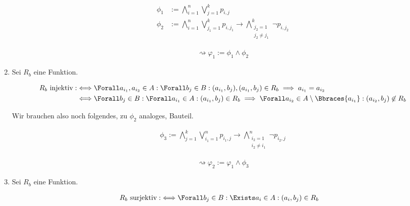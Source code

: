 \begin{solution}
\begin{enumerate}[label = \arabic*.]
  \begin{align*}
    \phi_1
    & :=
    \bigwedge_{i=1}^n \bigvee_{j=1}^kp_{i,j} \\
    \phi_2
    & :=
    \bigwedge_{i=1}^n \bigvee_{j_1=1}^kp_{i,j_1}
    \to
    \bigwedge_{\substack{j_2=1 \\ j_2\neq j_1}}^{k}\neg p_{i,j_2}
  \end{align*}

  \begin{align*}
    \rightsquigarrow
    \varphi_1 := \phi_1 \land \phi_2
  \end{align*}

  \item Sei $R_b$ eine Funktion.
  
  \begin{align*}
    R_b ~\text{injektiv}
    :\iff
    & \Forall a_{i_1}, a_{i_2} \in A:
    \Forall b_j \in B:
    (a_{i_1}, b_j), (a_{i_1}, b_j) \in R_b
    \implies
    a_{i_1} = a_{i_2} \\
    \iff
    & \Forall b_j \in B:
    \Forall a_{i_1} \in A:
    (a_{i_1}, b_j) \in R_b
    \implies
    \Forall a_{i_2} \in A \setminus \Bbraces{a_{i_1}}:
    (a_{i_2}, b_j) \not \in R_b
  \end{align*}

  Wir brauchen also noch folgendes, zu $\phi_2$ analoges, Bauteil.

  \begin{align*}
    \phi_3
    :=
    \bigwedge_{j=1}^k \bigvee_{i_1=1}^np_{i_1,j}
    \to
    \bigwedge_{\substack{i_2=1 \\ i_2\neq i_1}}^{n}\neg p_{i_2,j}
  \end{align*}

  \begin{align*}
    \rightsquigarrow
    \varphi_2
    :=
    \varphi_1 \land \phi_3
  \end{align*}
  

  \item Sei $R_b$ eine Funktion.
  
  \begin{align*}
    R_b ~\text{surjektiv}
    :\iff
    & \Forall b_j \in B:
    \Exists a_i \in A:
    (a_i, b_j) \in R_b
  \end{align*}


\end{enumerate}
\end{solution}
